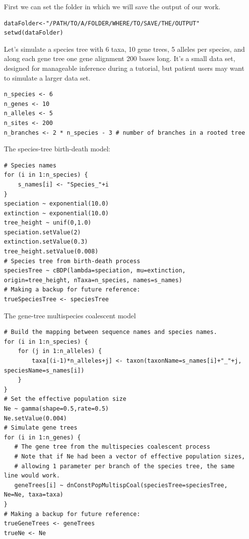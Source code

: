 \documentclass[11pt]{article}
\begin{document}
{\begin{framed}
First we can set the folder in which we will save the output of our work.
 {\tt \begin{snugshade*}
\begin{lstlisting}
dataFolder<-"/PATH/TO/A/FOLDER/WHERE/TO/SAVE/THE/OUTPUT"
setwd(dataFolder)
\end{lstlisting}
\end{snugshade*}}

Let's simulate a species tree with 6 taxa, 10 gene trees, 5 alleles per species, and along each gene tree one gene alignment 200 bases long.
It's a small data set, designed for manageable inference during a tutorial, but patient users may want to simulate a larger data set.

 {\tt \begin{snugshade*}
\begin{lstlisting}
n_species <- 6
n_genes <- 10
n_alleles <- 5
n_sites <- 200
n_branches <- 2 * n_species - 3 # number of branches in a rooted tree
\end{lstlisting}
\end{snugshade*}}

The species-tree birth-death model:

 {\tt \begin{snugshade*}
\begin{lstlisting}
# Species names
for (i in 1:n_species) {
	s_names[i] <- "Species_"+i
}
speciation ~ exponential(10.0)
extinction ~ exponential(10.0)
tree_height ~ unif(0,1.0)
speciation.setValue(2)
extinction.setValue(0.3)
tree_height.setValue(0.008)
# Species tree from birth-death process
speciesTree ~ cBDP(lambda=speciation, mu=extinction, origin=tree_height, nTaxa=n_species, names=s_names)
# Making a backup for future reference:
trueSpeciesTree <- speciesTree
\end{lstlisting}
\end{snugshade*}}

The gene-tree multispecies coalescent model
 {\tt \begin{snugshade*}
\begin{lstlisting}
# Build the mapping between sequence names and species names.
for (i in 1:n_species) {
	for (j in 1:n_alleles) {
		taxa[(i-1)*n_alleles+j] <- taxon(taxonName=s_names[i]+"_"+j, speciesName=s_names[i])
	}
}
# Set the effective population size
Ne ~ gamma(shape=0.5,rate=0.5)
Ne.setValue(0.004)
# Simulate gene trees
for (i in 1:n_genes) {
   # The gene tree from the multispecies coalescent process
   # Note that if Ne had been a vector of effective population sizes, 
   # allowing 1 parameter per branch of the species tree, the same line would work.
   geneTrees[i] ~ dnConstPopMultispCoal(speciesTree=speciesTree, Ne=Ne, taxa=taxa)
}
# Making a backup for future reference:
trueGeneTrees <- geneTrees
trueNe <- Ne
\end{lstlisting}
\end{snugshade*}}


\end{framed}}
\end{document}
